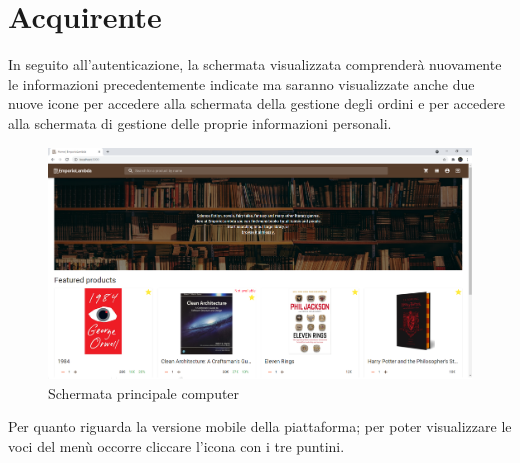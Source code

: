 \section{Acquirente}\label{Acquirente}
In seguito all'autenticazione, la schermata visualizzata comprenderà nuovamente le informazioni precedentemente indicate ma saranno visualizzate anche due nuove icone per accedere alla schermata della gestione degli ordini e per accedere alla schermata di gestione delle proprie informazioni personali.
\begin{figure}[h!]
	\centering
	\includegraphics[scale=0.4]{Immagini/Acquirente/Home.png}
	\caption{Schermata principale computer}
	\label{fig:HomePC}
\end{figure}
\newpage
Per quanto riguarda la versione mobile della piattaforma; per poter visualizzare le voci del menù occorre cliccare l'icona con i tre puntini.
